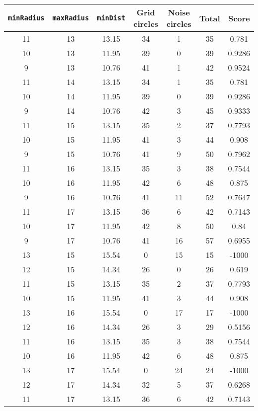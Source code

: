 \documentclass[letterpaper, 12pt]{article}
\begin{document}
\begin{longtable}{|c|c|c|c|c|c|c|}
\hline
\textbf{\texttt{minRadius}} & \textbf{\texttt{maxRadius}} & \textbf{\texttt{minDist}} & \textbf{Grid circles} & \textbf{Noise circles} & \textbf{Total} & \textbf{Score} \\
\hline
11 & 13 & 13.15 & 34 & 1 & 35 & 0.781 \\
\hline
10 & 13 & 11.95 & 39 & 0 & 39 & 0.9286 \\
\hline
9 & 13 & 10.76 & 41 & 1 & 42 & 0.9524 \\
\hline
11 & 14 & 13.15 & 34 & 1 & 35 & 0.781 \\
\hline
10 & 14 & 11.95 & 39 & 0 & 39 & 0.9286 \\
\hline
9 & 14 & 10.76 & 42 & 3 & 45 & 0.9333 \\
\hline
11 & 15 & 13.15 & 35 & 2 & 37 & 0.7793 \\
\hline
10 & 15 & 11.95 & 41 & 3 & 44 & 0.908 \\
\hline
9 & 15 & 10.76 & 41 & 9 & 50 & 0.7962 \\
\hline
11 & 16 & 13.15 & 35 & 3 & 38 & 0.7544 \\
\hline
10 & 16 & 11.95 & 42 & 6 & 48 & 0.875 \\
\hline
9 & 16 & 10.76 & 41 & 11 & 52 & 0.7647 \\
\hline
11 & 17 & 13.15 & 36 & 6 & 42 & 0.7143 \\
\hline
10 & 17 & 11.95 & 42 & 8 & 50 & 0.84 \\
\hline
9 & 17 & 10.76 & 41 & 16 & 57 & 0.6955 \\
\hline
13 & 15 & 15.54 & 0 & 15 & 15 & -1000 \\
\hline
12 & 15 & 14.34 & 26 & 0 & 26 & 0.619 \\
\hline
11 & 15 & 13.15 & 35 & 2 & 37 & 0.7793 \\
\hline
10 & 15 & 11.95 & 41 & 3 & 44 & 0.908 \\
\hline
13 & 16 & 15.54 & 0 & 17 & 17 & -1000 \\
\hline
12 & 16 & 14.34 & 26 & 3 & 29 & 0.5156 \\
\hline
11 & 16 & 13.15 & 35 & 3 & 38 & 0.7544 \\
\hline
10 & 16 & 11.95 & 42 & 6 & 48 & 0.875 \\
\hline
13 & 17 & 15.54 & 0 & 24 & 24 & -1000 \\
\hline
12 & 17 & 14.34 & 32 & 5 & 37 & 0.6268 \\
\hline
11 & 17 & 13.15 & 36 & 6 & 42 & 0.7143 \\
\hline

\end{longtable}
\end{document}
